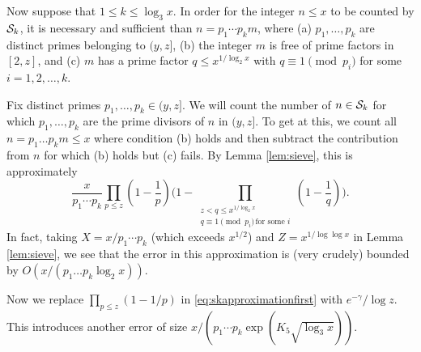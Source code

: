 \documentclass[11pt]{amsart}
\theoremstyle{remark}
\begin{document}
Now suppose that $1 \le k \le \log_3 x$. In order for the integer $n\le x$ to be counted by $\mathcal{S}_k$, it is necessary and sufficient than $n=p_1 \cdots p_k m$, where (a) $p_1,\dots,p_k$ are distinct primes belonging to $(y,z]$, (b) the integer $m$ is free of prime factors in $[2,z]$, and (c) $m$ has a prime factor $q \le x^{1/\log_2 x}$ with $q\equiv 1 \pmod{p_i}$ for some $i=1,2,\dots,k$.

Fix distinct primes $p_1,\dots,p_k \in (y,z]$. We will count the number of $n \in \mathcal{S}_k$ for which $p_1,\dots,p_k$ are the
prime divisors of $n$ in $(y,z]$. To get at this, we count all $n=p_1\dots p_k m\le x$ where condition (b) holds and then subtract the contribution from $n$ for which (b) holds but (c) fails. By Lemma \ref{lem:sieve}, this is approximately
\begin{equation}\label{eq:skapproximationfirst} \frac{x}{p_1\cdots p_k} \prod_{p \le z}\left(1-\frac{1}{p}\right) \Bigg(1- \prod_{\substack{z < q\le x^{1/\log_2 x} \\ q\equiv 1\!\!\!\!\!\pmod{p_i}\,\text{for some $i$}}}\left(1-\frac{1}{q}\right) \Bigg). \end{equation}
In fact, taking $X=x/p_1 \cdots p_k$ (which exceeds $x^{1/2}$) and $Z = x^{1/\log\log{x}}$ in Lemma \ref{lem:sieve}, we see that the error in this approximation is (very crudely) bounded by $O(x/(p_1\dots p_k \log_2 x))$.

Now we replace $\prod_{p\le z} (1-1/p)$ in \eqref{eq:skapproximationfirst} with $e^{-\gamma}/\log{z}$. This introduces another error of size $x/(p_1\cdots p_k \exp(K_5 \sqrt{\log_3 x}))$.
\end{document}

